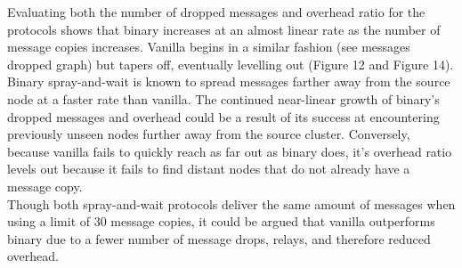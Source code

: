 \documentclass{article}
\begin{document}
\newline Evaluating both the number of dropped messages and overhead ratio for the protocols shows that binary increases at an almost linear rate as the number of message copies increases. Vanilla begins in a similar fashion (see messages dropped graph) but tapers off, eventually levelling out (Figure 12 and Figure 14). Binary spray-and-wait is known to spread messages farther away from the source node at a faster rate than vanilla. The continued near-linear growth of binary's dropped messages and overhead could be a result of its success at encountering previously unseen nodes further away from the source cluster. Conversely, because vanilla fails to quickly reach as far out as binary does, it's overhead ratio levels out because it fails to find distant nodes that do not already have a message copy.\\
\newline Though both spray-and-wait protocols deliver the same amount of messages when using a limit of 30 message copies, it could be argued that vanilla outperforms binary due to a fewer number of message drops, relays, and therefore reduced overhead.

\end{document}
